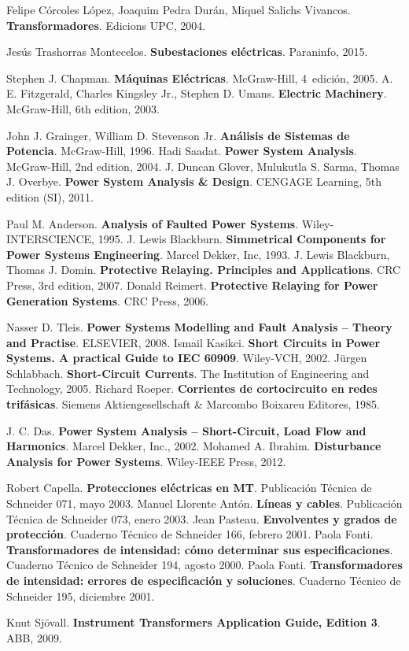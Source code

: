 \begin{thebibliography}{99}
     Felipe Córcoles López, Joaquim Pedra Durán, Miquel Salichs Vivancos. \textbf{Transformadores}.  Edicions UPC, 2004.

     Jesús Trashorras Montecelos. \textbf{Subestaciones eléctricas}.  Paraninfo, 2015.


     Stephen J. Chapman. \textbf{Máquinas Eléctricas}.  McGraw-Hill, 4\textordfeminine\ edición, 2005.
     A. E. Fitzgerald, Charles Kingsley Jr., Stephen D. Umans. \textbf{Electric Machinery}.  McGraw-Hill, 6th edition, 2003.


     John J. Grainger, William D. Stevenson Jr. \textbf{Análisis de Sistemas de Potencia}.  McGraw-Hill, 1996.
     Hadi Saadat. \textbf{Power System Analysis}.  McGraw-Hill, 2nd edition, 2004.
     J. Duncan Glover, Mulukutla S. Sarma, Thomas J. Overbye. \textbf{Power System Analysis \& Design}.  CENGAGE Learning, 5th edition (SI), 2011.

     Paul M. Anderson. \textbf{Analysis of Faulted Power Systems}.  Wiley-INTERSCIENCE, 1995.
     J. Lewis Blackburn. \textbf{Simmetrical Components for Power Systems Engineering}.  Marcel Dekker, Inc, 1993.
     J. Lewis Blackburn, Thomas J. Domin. \textbf{Protective Relaying. Principles and Applications}.  CRC Press, 3rd edition, 2007.
     Donald Reimert. \textbf{Protective Relaying for Power Generation Systems}.  CRC Press, 2006.


     Nasser D. Tleis. \textbf{Power Systems Modelling and Fault Analysis -- Theory and Practise}.  ELSEVIER, 2008.
     Ismail Kasikci. \textbf{Short Circuits in Power Systems. A practical Guide to IEC 60909}.  Wiley-VCH, 2002.
     Jürgen Schlabbach. \textbf{Short-Circuit Currents}.  The Institution of Engineering and Technology, 2005.
     Richard Roeper. \textbf{Corrientes de cortocircuito en redes trifásicas}.  Siemens Aktiengesellschaft \& Marcombo Boixareu Editores, 1985.

     J. C. Das. \textbf{Power System Analysis -- Short-Circuit, Load Flow and Harmonics}. Marcel Dekker, Inc., 2002.
     Mohamed A. Ibrahim. \textbf{Disturbance Analysis for Power Systems}. Wiley-IEEE Press, 2012.

     Robert Capella. \textbf{Protecciones eléctricas en MT}.  Publicación Técnica de Schneider 071, mayo 2003.
     Manuel Llorente Antón. \textbf{Líneas y cables}.  Publicación Técnica de Schneider 073, enero 2003.
     Jean Pasteau. \textbf{Envolventes y grados de protección}.  Cuaderno Técnico de Schneider 166, febrero 2001.
     Paola Fonti. \textbf{Transformadores de intensidad: cómo determinar sus especificaciones}.  Cuaderno Técnico de Schneider 194, agosto 2000.
     Paola Fonti. \textbf{Transformadores de intensidad: errores de especificación y soluciones}.  Cuaderno Técnico de Schneider 195, diciembre 2001.

     Knut Sjövall. \textbf{Instrument Transformers Application Guide, Edition 3}.  ABB, 2009.

\end{thebibliography}
